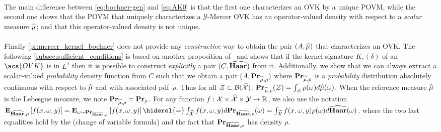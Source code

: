 \documentclass[twoside,11pt]{article}
\begin{document}
\paragraph{}
The main difference between \cref{eq:bochner-gen} and
\cref{eq:AK0} is that the first one characterizes an \acs{OVK}
by a unique \acf{POVM}, while the second one shows that the \acs{POVM} that
uniquely characterizes a $\mathcal{Y}$-Mercer \acs{OVK} has an operator-valued
density with respect to a \emph{scalar} measure $\widehat{\mu}$; and that this
operator-valued density is not unique.
\paragraph{}
Finally \cref{pr:mercer_kernel_bochner} does not provide any
\emph{constructive} way to obtain the pair $(A,\widehat{\mu})$ that characterizes
an \acs{OVK}. The following \cref{subsec:sufficient_conditions} is based on
another proposition of~\citeauthor{carmeli2006vector} and shows that if the
kernel signature $K_e(\delta)$ of an $\acs{OVK}$ is in $L^1$ then it is
possible to construct \emph{explicitly} a pair $(C,\widehat{\mathbf{Haar}})$ from it.
Additionally, we show that we can always extract a scalar-valued
\emph{probability} density function from $C$ such that we obtain a pair
$(A,{\mathbf{{Pr}}}_{\widehat{\mu},\rho})$ where ${\mathbf{{Pr}}}_{\widehat{\mu},\rho}$ is
a \emph{probability} distribution absolutely continuous with respect to
$\widehat{\mu}$ and with associated \ac{pdf}~$\rho$. Thus for all
$\mathcal{Z}\subset\mathcal{B}(\widehat{\mathcal{X}})$,
${\mathbf{{Pr}}}_{\widehat{\mu},\rho}(\mathcal{Z})=\int_{\mathcal{Z}}
\rho(\omega)d\widehat{\mu}(\omega)$.  When the reference measure $\widehat{\mu}$ is
the Lebesgue measure, we note
${\mathbf{{Pr}}}_{\widehat{\mu},\rho}={\mathbf{{Pr}}}_\rho$. For any function
$f:\mathcal{X}\times\widehat{\mathcal{X}}\times\mathcal{Y}\to\mathbb{R}$, we also
use the notation $\expectation_{\dual{\Haar}, \rho}\left[f(x, \omega, y)\right]
=\expectation_{\omega\sim\probability_{\dual{\Haar},\rho}}\left[f(x, \omega,
y)\right] \hiderel{=}\int_{\dual{\mathcal{X}}} f(x, \omega, y)
d\probability_{\dual{\Haar}, \rho}(\omega) =\int_{\dual{\mathcal{X}}} f(x,
\omega, y)\rho(\omega) d\dual{\Haar}(\omega)$.  where the two last equalities
hold by the  (change of variable
formula) and the fact that ${\mathbf{{Pr}}}_{\widehat{\mathbf{Haar}}, \rho}$ has density
$\rho$.
\end{document}
